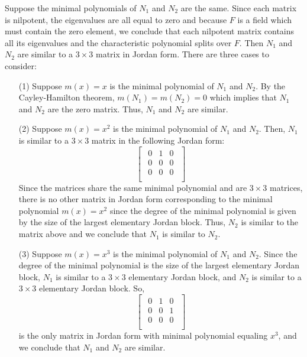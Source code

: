 \documentclass{article}
\begin{document}
Suppose the minimal polynomials of $N_1$ and $N_2$ are the same. Since each matrix is nilpotent, the eigenvalues are all equal to zero and because $F$ is a field which must contain the zero element, we conclude that each nilpotent matrix contains all its eigenvalues and the characteristic polynomial splits over $F$.  Then $N_1$ and $N_2$ are similar to a $3\times 3$ matrix in Jordan form. There are three cases to consider:
	\begin{enumerate}
		\item[(1)] Suppose $m(x) = x$ is the minimal polynomial of $N_1$ and $N_2$. By the Cayley-Hamilton theorem, 
			$m(N_1) = m(N_2) = 0$ which implies that $N_1$ and $N_2$ are the zero matrix. Thus, $N_1$ and $N_2$ are similar.
		\item[(2)] Suppose $m(x) = x^2$ is the minimal polynomial of $N_1$ and $N_2$. Then, $N_1$ is similar to a $3\times 3$ matrix
			in the following Jordan form:
				\[ \begin{bmatrix} 
					\begin{array}{ccc}
 						0 & 1 & 0 \\
 						0 & 0 & 0 \\
 						0 & 0 & 0 \\
					\end{array}
				\end{bmatrix}\]
			Since the matrices share the same minimal polynomial and are $3\times 3$ matrices, there is no other matrix in Jordan form
			corresponding to the minimal polynomial $m(x) = x^2$ since the degree of the minimal polynomial is given by the size of the
			largest elementary Jordan block. Thus, $N_2$ is similar to the matrix above and we conclude that $N_1$ is similar to $N_2$.
		\item[(3)] Suppose $m(x) = x^3$ is the minimal polynomial of $N_1$ and $N_2$. Since the degree of the minimal polynomial 
			is the size of the largest elementary Jordan block, $N_1$ is similar to a $3\times 3$ elementary Jordan block, and
			 $N_2$ is similar to a $3\times 3$ elementary Jordan block. So, 
				\[ \begin{bmatrix} 
					\begin{array}{ccc}
 						0 & 1 & 0 \\
 						0 & 0 & 1 \\
 						0 & 0 & 0 \\
					\end{array}
				\end{bmatrix}\]			 
			is the only matrix in Jordan form with minimal polynomial equaling $x^3$, and we conclude that $N_1$ and $N_2$ are similar.
	\end{enumerate}
\end{document}

